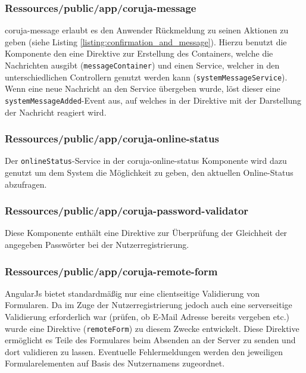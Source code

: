 \subsubsection{Ressources/public/app/coruja-message}
coruja-message erlaubt es den Anwender Rückmeldung zu seinen Aktionen zu geben (siehe Listing \ref{listing:confirmation_and_message}). Hierzu benutzt die Komponente den eine Direktive zur Erstellung des Containers, welche die Nachrichten ausgibt (\texttt{messageContainer}) und einen Service, welcher in den unterschiedlichen Controllern genutzt werden kann (\texttt{systemMessageService}). Wenn eine neue Nachricht an den Service übergeben wurde, löst dieser eine \texttt{systemMessageAdded}-Event aus, auf welches in der Direktive mit der Darstellung der Nachricht reagiert wird. 

\subsubsection{Ressources/public/app/coruja-online-status}
Der \texttt{onlineStatus}-Service in der coruja-online-status Komponente wird dazu genutzt um dem System die Möglichkeit zu geben, den aktuellen Online-Status abzufragen.

\subsubsection{Ressources/public/app/coruja-password-validator}
Diese Komponente enthält eine Direktive zur Überprüfung der Gleichheit der angegeben Passwörter bei der Nutzerregistrierung.

\subsubsection{Ressources/public/app/coruja-remote-form}
AngularJs bietet standardmäßig nur eine clientseitige Validierung von Formularen. Da im Zuge der Nutzerregistrierung jedoch auch eine serverseitige Validierung erforderlich war (prüfen, ob E-Mail Adresse bereits vergeben etc.) wurde eine Direktive (\texttt{remoteForm}) zu diesem Zwecke entwickelt. Diese Direktive ermöglicht es Teile des Formulares beim Absenden an der Server zu senden und dort validieren zu lassen. Eventuelle Fehlermeldungen werden den jeweiligen Formularelementen auf Basis des Nutzernamens zugeordnet.

